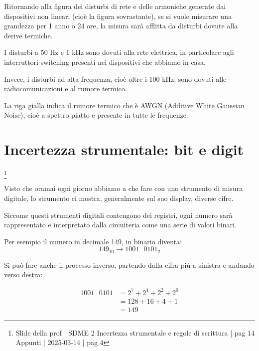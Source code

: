 Ritornando alla figura dei disturbi di rete e delle armoniche generate dai dispositivi non lineari (cioè la figura sovrastante), 
se si vuole misurare una grandezza per 1 anno o 24 ore, la misura sarà afflitta da disturbi dovute alla derive termiche. \newline 

I disturbi a 50 Hz e 1 kHz sono dovuti alla rete elettrica, in particolare agli interruttori switching presenti nei dispositivi che abbiamo in casa. \newline 

Invece, i disturbi ad alta frequenza, cioè oltre i 100 kHz, sono dovuti alle radiocomunicazioni e al rumore termico. \newline 

La riga gialla indica il rumore termico che è AWGN (Additive White Gaussian Noise), cioè a spettro piatto e presente in tutte le frequenze. \newline 

\newpage 

\section{Incertezza strumentale: bit e digit}
\footnote{Slide della prof | SDME 2 Incertezza strumentale e regole di scrittura | pag 14 \\  
Appunti | 2025-03-14 | pag 4}

Visto che oramai ogni giorno abbiamo a che fare con uno strumento di misura digitale, 
lo strumento ci mostra, generalmente sul suo display, diverse cifre. \newline 

Siccome questi strumenti digitali contengono dei registri, ogni numero sarà 
rappresentato e interpretato dalla circuiteria come una serie di valori binari. \newline 

Per esempio il numero in decimale 149, in binario diventa: 
{
    \Large
    \begin{equation}
        149_{10} 
        \to 
        1001\text { } 0101_{2}
    \end{equation}
}

Si può fare anche il processo inverso, partendo dalla cifra più a sinistra e andando verso destra: 

{
    \Large 
    \begin{equation}
        \begin{split}
        1001\text { } 0101 
        &= 
        2^{7} + 2^{4} + 2^{2} + 2^{0} 
        \\ 
        &= 
        128 + 16 + 4 + 1 
        \\ 
        &= 
        149
        \end{split}
    \end{equation}
}

